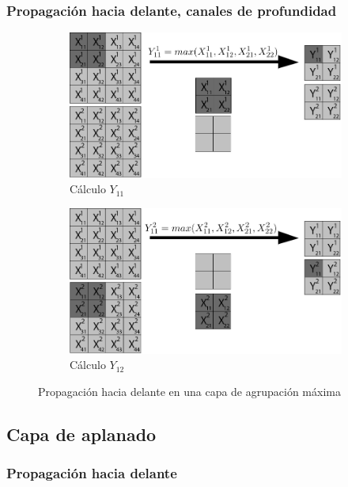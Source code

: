 \subsubsection{Propagación hacia delante, canales de profundidad}

\begin{figure}[H]
	\centering
	\begin{subfigure}{.5\textwidth}
		\hspace{-10mm}
		\includegraphics[width=1.2\linewidth]{imagenes/maxpool_2capas_1.jpg}  
		\caption{Cálculo $Y_{11}$}
	\end{subfigure}%
	\begin{subfigure}{.5\textwidth}
		\hspace{10mm}
		\includegraphics[width=1.2\linewidth]{imagenes/maxpool_2capas_2.jpg}  
		\caption{Cálculo $Y_{12}$}
	\end{subfigure}
	
	\caption{Propagación hacia delante en una capa de agrupación máxima}
	\label{fig:forward_prop_maxpool_canales_profundidad}
\end{figure}

\subsection{Capa de aplanado}

\subsubsection{Propagación hacia delante}
